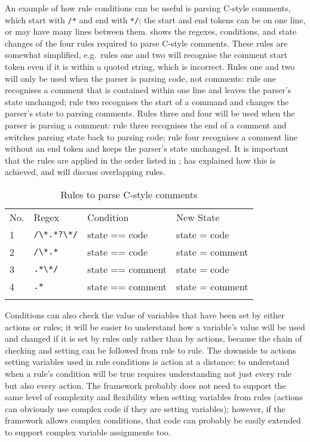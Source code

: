 An example of how rule conditions can be useful is parsing C-style
comments, which start with \texttt{/*} and end with \texttt{*/}; the start
and end tokens can be on one line, or may have many lines between them.
 shows the regexes, conditions,
and state changes of the four rules required to parse C-style comments.
These rules are somewhat simplified, e.g.\ rules one and two will recognise
the comment start token even if it is within a quoted string, which is
incorrect.  Rules one and two will only be used when the parser is parsing
code, not comments: rule one recognises a comment that is contained within
one line and leaves the parser's state unchanged; rule two recognises the
start of a command and changes the parser's state to parsing comments.
Rules three and four will be used when the parser is parsing a comment:
rule three recognises the end of a comment and switches parsing state back
to parsing code; rule four recognises a comment line without an end token
and keeps the parser's state unchanged.  It is important that the rules are
applied in the order listed in ;
 has explained how this is achieved, and
 will discuss overlapping
rules.

\begin{table}[ht]
    \caption{Rules to parse C-style comments}
    \empty{}\label{Rules to parse C-style comments}
    \begin{tabular}{llll}
        \tabletopline{}%
        No.   & Regex             & Condition         & New State         \\
        \tablemiddleline{}%
        1     & \verb!/\*.*?\*/!  & state == code     & state = code      \\
        2     & \verb!/\*.*!      & state == code     & state = comment   \\
        3     & \verb!.*\*/!      & state == comment  & state = code      \\
        4     & \verb!.*!         & state == comment  & state = comment   \\
        \tablebottomline{}%
    \end{tabular}
\end{table}

Conditions can also check the value of variables that have been set by
either actions or rules; it will be easier to understand how a variable's
value will be used and changed if it is set by rules only rather than by
actions, because the chain of checking and setting can be followed from
rule to rule.  The downside to actions setting variables used in rule
conditions is action at a distance: to understand when a rule's condition
will be true requires understanding not just every rule but also every
action.  The framework probably does not need to support the same level of
complexity and flexibility when setting variables from rules (actions can
obviously use complex code if they are setting variables); however, if the
framework allows complex conditions, that code can probably be easily
extended to support complex variable assignments too.

